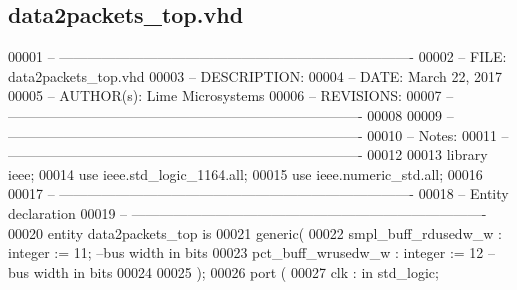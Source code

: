 \subsection{data2packets\+\_\+top.\+vhd}
\label{data2packets__top_8vhd_source}

\begin{DoxyCode}
00001 \textcolor{keyword}{-- ---------------------------------------------------------------------------- }
00002 \textcolor{keyword}{-- FILE:    data2packets\_top.vhd}
00003 \textcolor{keyword}{-- DESCRIPTION:  }
00004 \textcolor{keyword}{-- DATE:    March 22, 2017}
00005 \textcolor{keyword}{-- AUTHOR(s):   Lime Microsystems}
00006 \textcolor{keyword}{-- REVISIONS:}
00007 \textcolor{keyword}{-- ---------------------------------------------------------------------------- }
00008 
00009 \textcolor{keyword}{-- ----------------------------------------------------------------------------}
00010 \textcolor{keyword}{-- Notes:}
00011 \textcolor{keyword}{-- ----------------------------------------------------------------------------}
00012 
00013 \textcolor{vhdlkeyword}{library }\textcolor{keywordflow}{ieee};
00014 \textcolor{vhdlkeyword}{use }ieee.std\_logic\_1164.\textcolor{keywordflow}{all};
00015 \textcolor{vhdlkeyword}{use }ieee.numeric\_std.\textcolor{keywordflow}{all};
00016 
00017 \textcolor{keyword}{-- ----------------------------------------------------------------------------}
00018 \textcolor{keyword}{-- Entity declaration}
00019 \textcolor{keyword}{-- ----------------------------------------------------------------------------}
00020 \textcolor{keywordflow}{entity }data2packets_top \textcolor{keywordflow}{is}
00021    \textcolor{keywordflow}{generic}\textcolor{vhdlchar}{(}
00022       \textcolor{vhdlchar}{smpl_buff_rdusedw_w} \textcolor{vhdlchar}{:} \textcolor{comment}{integer} \textcolor{vhdlchar}{:=} \textcolor{vhdllogic}{}\textcolor{vhdllogic}{11};\textcolor{keyword}{ --bus width in bits }
00023       \textcolor{vhdlchar}{pct_buff_wrusedw_w}  \textcolor{vhdlchar}{:} \textcolor{comment}{integer} \textcolor{vhdlchar}{:=} \textcolor{vhdllogic}{}\textcolor{vhdllogic}{12}\textcolor{keyword}{ --bus width in bits      }
00024       
00025    \textcolor{vhdlchar}{)};
00026    \textcolor{keywordflow}{port} \textcolor{vhdlchar}{(}
00027       \textcolor{vhdlchar}{clk}               \textcolor{vhdlchar}{:} \textcolor{keywordflow}{in} \textcolor{comment}{std\_logic};

\end{DoxyCode}
